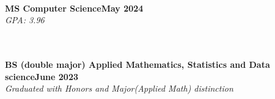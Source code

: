  \\

\textbf{MS Computer Science}\hfill \textbf{May 2024}  \\
\textit{GPA: 3.96}\strut \\

\vspace{7pt}
\\

\textbf{BS (double major) Applied Mathematics, Statistics and Data science}\hfill \textbf{June 2023} \\

\textit{Graduated with Honors and Major(Applied Math) distinction}\strut \hfill \\



